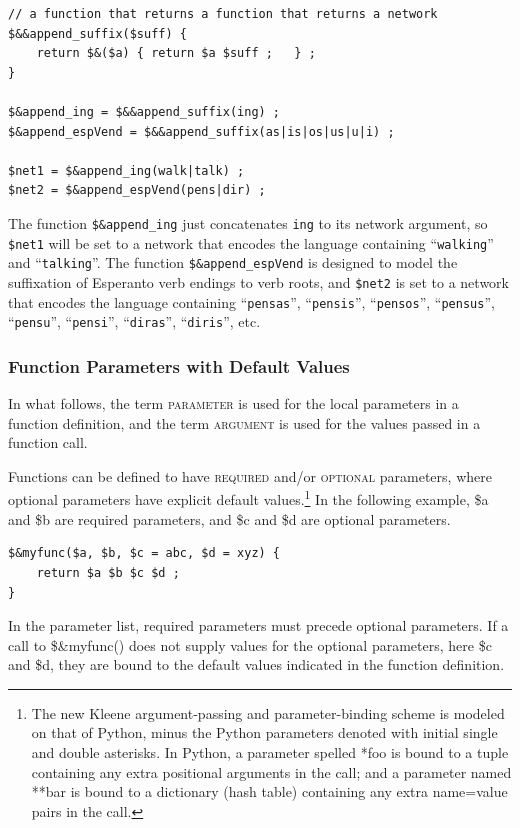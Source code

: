 \documentclass[letterpaper,12pt]{article}
\newcommand{\acro}{\textsc}
\newcommand{\str}[1]{``\texttt{#1}''}
\begin{document}
\begin{Verbatim}[fontsize=\small]
// a function that returns a function that returns a network
$&&append_suffix($suff) {
	return $&($a) { return $a $suff ;	} ;
}

$&append_ing = $&&append_suffix(ing) ;
$&append_espVend = $&&append_suffix(as|is|os|us|u|i) ;

$net1 = $&append_ing(walk|talk) ;
$net2 = $&append_espVend(pens|dir) ;
\end{Verbatim}

\noindent
The function \verb!$&append_ing! just concatenates \verb!ing! to
its network argument, so \verb!$net1! will be set to a network that
encodes the language containing \str{walking} and \str{talking}.
The function \verb!$&append_espVend! is designed to model the
suffixation of Esperanto verb endings to verb roots, and
\verb!$net2! is set to a network that encodes the language
containing \str{pensas}, \str{pensis}, \str{pensos},
\str{pensus}, \str{pensu}, \str{pensi}, \str{diras}, \str{diris}, etc.


\subsubsection{Function Parameters with Default Values}

In what follows, the term \acro{parameter} is used for the local
parameters in a function definition, and the term \acro{argument} is
used for the values passed in a function call.

Functions can be defined to have \acro{required} and/or \acro{optional}
parameters, where optional parameters have explicit default
values.\footnote{The new Kleene argument-passing and parameter-binding scheme
is modeled on that of Python, minus the Python parameters denoted with
initial single and double asterisks.  In Python, a parameter spelled
*foo is bound to a tuple containing any extra positional arguments in
the call; and
a parameter named **bar is bound to a dictionary (hash table) containing any
extra name=value pairs in the call.} In
the following example, \$a and \$b are required parameters, and \$c and
\$d are optional parameters.

\begin{Verbatim}[fontsize=\small]
$&myfunc($a, $b, $c = abc, $d = xyz) {
	return $a $b $c $d ;
}
\end{Verbatim}

\noindent
In the parameter list, required parameters must precede optional parameters.
If a call to \$\&myfunc() does not supply values for the optional
parameters, here \$c and \$d, they are bound to the default values indicated
in the function definition.
\end{document}
